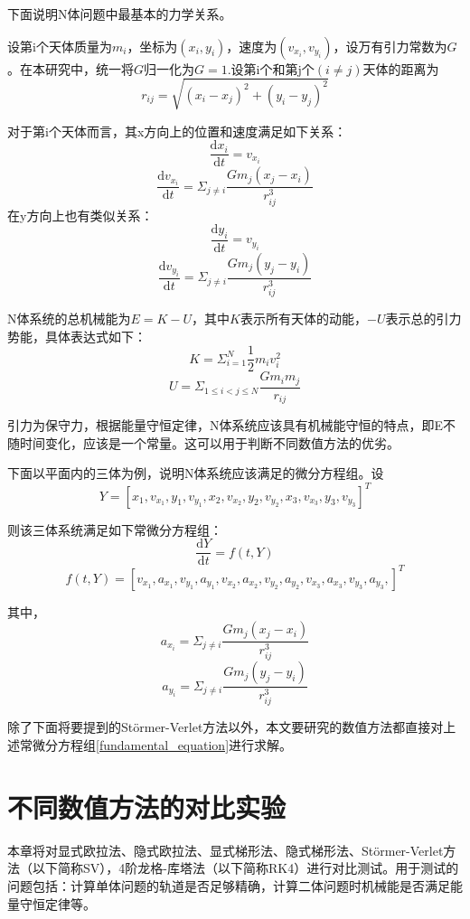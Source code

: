 \documentclass{article}
\begin{document}
\par 下面说明N体问题中最基本的力学关系。
\par 设第i个天体质量为$m_i$，坐标为$(x_i,y_i)$，速度为$(v_{x_i},v_{y_i})$，设万有引力常数为$G$。在本研究中，统一将$G$归一化为$G=1$.设第i个和第j个$(i\ne j)$天体的距离为$$r_{ij}=\sqrt{(x_i-x_j)^2+(y_i-y_j)^2}$$
\par 对于第i个天体而言，其x方向上的位置和速度满足如下关系：
$$\frac{\text{d}x_i}{\text{d}t} = v_{x_i}$$
$$\frac{\text{d}v_{x_i}}{\text{d}t} = \Sigma_{j \ne i}\frac{Gm_j(x_j-x_i)}{r_{ij}^3}$$
在y方向上也有类似关系：
$$\frac{\text{d}y_i}{\text{d}t} = v_{y_i}$$
$$\frac{\text{d}v_{y_i}}{\text{d}t} = \Sigma_{j \ne i}\frac{Gm_j(y_j-y_i)}{r_{ij}^3}$$
\par N体系统的总机械能为$E= K - U$，其中$K$表示所有天体的动能，$-U$表示总的引力势能，具体表达式如下：
$$K=\Sigma_{i=1}^{N} \frac{1}{2}m_iv_i^{2}$$
$$U = \Sigma_{1\le i < j \le N}\frac{Gm_im_j}{r_{ij}}$$
\par 引力为保守力，根据能量守恒定律，N体系统应该具有机械能守恒的特点，即E不随时间变化，应该是一个常量。这可以用于判断不同数值方法的优劣。
\par 下面以平面内的三体为例，说明N体系统应该满足的微分方程组。设
$$Y=
[
	x_1, v_{x_1} ,y_1 ,v_{y_1}, x_2, v_{x_2}, y_2 ,v_{y_2} ,  x_3 , v_{x_3} ,y_3 ,v_{y_3}
]
^T$$
\par 则该三体系统满足如下常微分方程组：
\begin{equation}
	\frac{\text{d}Y}{\text{d}t} = f(t,Y)  \label{fundamental_equation}
\end{equation}
$$
f(t,Y) = [v_{x_1},a_{x_1},v_{y_1},a_{y_1}, v_{x_2},a_{x_2},v_{y_2},a_{y_2},v_{x_3},a_{x_3},v_{y_3},a_{y_3},]^T $$
\par 其中，
$$
a_{x_i} = \Sigma_{j \ne i}\frac{Gm_j(x_j-x_i)}{r_{ij}^3}$$
$$
a_{y_i} = \Sigma_{j \ne i}\frac{Gm_j(y_j-y_i)}{r_{ij}^3}$$
\par 除了下面将要提到的Störmer-Verlet方法以外，本文要研究的数值方法都直接对上述常微分方程组\ref{fundamental_equation}进行求解。

	
\section{不同数值方法的对比实验}
\par 本章将对显式欧拉法、隐式欧拉法、显式梯形法、隐式梯形法、Störmer-Verlet方法（以下简称SV），4阶龙格-库塔法（以下简称RK4）进行对比测试。用于测试的问题包括：计算单体问题的轨道是否足够精确，计算二体问题时机械能是否满足能量守恒定律等。
\end{document}
